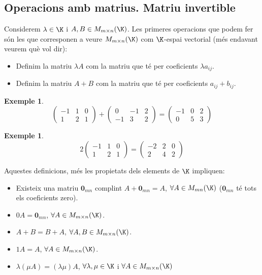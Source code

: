 \documentclass[a4paper,12pt,twoside]{article}
\newcommand{\1}{\mathbf{1}}
\newcommand{\0}{\mathbf{0}}
\theoremstyle{definition}
\newtheorem{exemple}[teorema]{Exemple}
\theoremstyle{remark}
\begin{document}
\subsection{Operacions amb matrius. Matriu invertible}
Considerem $\lambda \in \K$ i $A,B \in M_{m\times n}(\K)$. Les primeres operacions que podem fer són les que corresponen a veure $M_{m\times n} (\K)$ com $\K$-espai vectorial (més endavant veurem què vol dir):
\begin{itemize}
	\item Definim la matriu $\lambda A$ com la matriu que té per coeficients $\lambda a_{ij}$.
	\item Definim la matriu $A+B$ com la matriu que té per coeficients $a_{ij}+b_{ij}$.
\end{itemize}
\begin{exemple}
	$$
	\begin{pmatrix} -1 & 1 & 0 \\ 1 & 2 & 1 \end{pmatrix} +
	\begin{pmatrix} 0 & -1 & 2 \\ -1 & 3 & 2 \end{pmatrix} =
	\begin{pmatrix} -1 & 0 & 2 \\ 0 & 5 & 3 \end{pmatrix}
	$$
\end{exemple}
\begin{exemple}
	$$
	2 \begin{pmatrix} -1 & 1 & 0 \\ 1 & 2 & 1 \end{pmatrix} =
	\begin{pmatrix} -2 & 2 & 0 \\ 2 & 4 & 2 \end{pmatrix} 
	$$
\end{exemple}
Aquestes definicions, més les propietats dels elements de $\K$ impliquen:
\begin{itemize}
	\item Existeix una matriu $\0_{mn}$ complint $A+\0_{mn}=A$, $\forall A \in M_{mn}(\K)$ ($\0_{mn}$ té tots els coeficients zero).
	\item $0 A = \0_{mn}$, $\forall A \in M_{m\times n}(\K)$.
	\item $A+B=B+A$, $\forall A,B \in M_{m\times n}(\K)$.
	\item $1A=A$, $\forall A \in M_{m\times n}(\K)$.
	\item $\lambda (\mu A)= (\lambda \mu) A$, $\forall \lambda,\mu \in \K$ i $\forall A \in M_{m\times n}(\K)$
\end{itemize}
\end{document}
